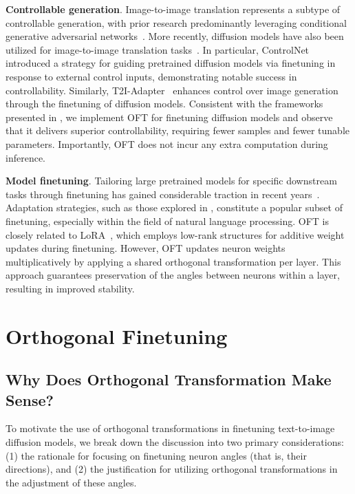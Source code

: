 \textbf{Controllable generation}. Image-to-image translation represents a subtype of controllable generation, with prior research predominantly leveraging conditional generative adversarial networks~\cite{isola2017image,zhu2017toward,wang2018high,park2019semantic,choi2018stargan}. More recently, diffusion models have also been utilized for image-to-image translation tasks~\cite{saharia2022palette,voynov2022sketch,wang2022pretraining}. In particular, ControlNet~\cite{zhang2023adding} introduced a strategy for guiding pretrained diffusion models via finetuning in response to external control inputs, demonstrating notable success in controllability. Similarly, T2I-Adapter~\cite{mou2023t2i} enhances control over image generation through the finetuning of diffusion models. Consistent with the frameworks presented in \cite{zhang2023adding,mou2023t2i}, we implement OFT for finetuning diffusion models and observe that it delivers superior controllability, requiring fewer samples and fewer tunable parameters. Importantly, OFT does not incur any extra computation during inference.

\textbf{Model finetuning}. Tailoring large pretrained models for specific downstream tasks through finetuning has gained considerable traction in recent years~\cite{devlin2018bert,brown2020language,he2022masked}. Adaptation strategies, such as those explored in \cite{hulora2022,houlsby2019parameter,pfeiffer2020adapterfusion}, constitute a popular subset of finetuning, especially within the field of natural language processing. OFT is closely related to LoRA~\cite{hulora2022}, which employs low-rank structures for additive weight updates during finetuning. However, OFT updates neuron weights multiplicatively by applying a shared orthogonal transformation per layer. This approach guarantees preservation of the angles between neurons within a layer, resulting in improved stability.

\section{Orthogonal Finetuning}

\subsection{Why Does Orthogonal Transformation Make Sense?}

To motivate the use of orthogonal transformations in finetuning text-to-image diffusion models, we break down the discussion into two primary considerations: (1) the rationale for focusing on finetuning neuron angles (that is, their directions), and (2) the justification for utilizing orthogonal transformations in the adjustment of these angles.

